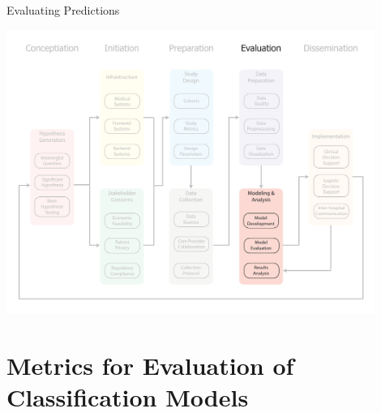 \documentclass[10pt, xcolor=table]{beamer}
\begin{document}
\begin{frame}{Evaluating Predictions}
	\begin{center}
		\includegraphics[width=0.9\textwidth]{images/informatics_pipeline_modeling.pdf}	
	\end{center}
\end{frame}



\section{Metrics for Evaluation of Classification Models}
\end{document}
